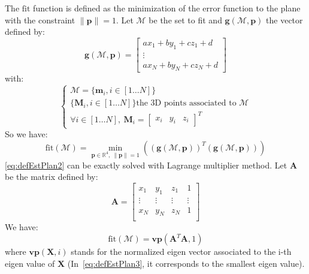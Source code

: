 \documentclass[letterpaper, 10 pt, conference]{ieeeconf}
\begin{document}
The $\mathrm{fit}$ function is defined as the minimization of the error function to the plane with the constraint $\|\mathbf{p}\|=1$. Let $\mathcal{M}$ be the set to fit and $\mathbf{g}(\mathcal{M},\mathbf{p})$ the vector defined by:
\begin{equation}
\mathbf{g}(\mathcal{M},\mathbf{p})=
	\begin{bmatrix}
		ax_1 + by_1 + cz_1 +d \\
		\vdots\\
		ax_N + by_N + cz_N + d
	\end{bmatrix}
	\label{eq:defEstPlan1}
\end{equation}
with:
\begin{equation}
	\left\{
		\begin{array}{l}
			\mathcal{M} = \{\mathbf{m}_i,i\in[1\dots N]\}\\
			\{\mathbf{M}_i,i\in[1\dots N]\}\mbox{the 3D points associated to }\mathcal{M}\\
			\forall i\in[1\dots N],\ \mathbf{M}_i = \begin{bmatrix} x_i & y_i & z_i \end{bmatrix}^T
		\end{array}
	\right.
\end{equation}
So we have:
\begin{equation}
	\mathrm{fit}(\mathcal{M}) = \min_{\mathbf{p}\in\mathbb{R}^4,\ \|\mathbf{p}\|=1}\left(\left(\mathbf{g}(\mathcal{M},\mathbf{p})\right)^T\left(\mathbf{g}(\mathcal{M},\mathbf{p})\right)\right)
	\label{eq:defEstPlan2}
\end{equation}
\eqref{eq:defEstPlan2} can be exactly solved with Lagrange multiplier method. Let $\mathbf{A}$ be the matrix defined by:
\begin{equation}
	\mathbf{A}=
	\begin{bmatrix}
		x_1 & y_1 & z_1 & 1 \\
		\vdots & \vdots & \vdots & \vdots \\
		x_N & y_N & z_N & 1 \\
	\end{bmatrix}
\end{equation}
We have:
\begin{equation}
	\mathrm{fit}(\mathcal{M}) = \mathbf{vp}(\mathbf{A}^T\mathbf{A},1)
	\label{eq:defEstPlan3}
\end{equation}
where  $\mathbf{vp}(\mathbf{X},i)$ stands for the normalized eigen vector associated to the i-th  eigen value of $\mathbf{X}$ (In~\eqref{eq:defEstPlan3}, it corresponds to the smallest eigen value).
\end{document}
